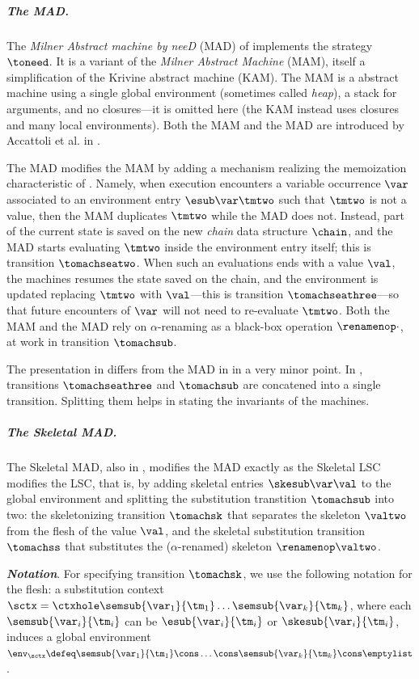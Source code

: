 \subparagraph{The MAD.} The \emph{Milner Abstract machine by neeD} (MAD) of  implements the \cbneed strategy $\toneed$. It is a \cbneed variant of the \emph{Milner Abstract Machine} (MAM), itself a simplification of the Krivine abstract machine (KAM). The MAM is a \cbn abstract machine using a single global environment (sometimes called \emph{heap}), a stack for arguments, and no closures---it is omitted here (the KAM instead uses closures and many local environments).  Both the MAM and the MAD are introduced by Accattoli et al. in \cite{DBLP:conf/icfp/AccattoliBM14}.

The MAD modifies the MAM by adding a mechanism realizing the memoization characteristic of \cbneed. Namely, when execution encounters a variable occurrence $\var$ associated to an environment entry $\esub\var\tmtwo$ such that $\tmtwo$ is not a value, then the MAM duplicates $\tmtwo$ while the MAD does not. Instead, part of the current state is saved on the new \emph{chain} data structure $\chain$, and the MAD starts evaluating $\tmtwo$ inside the environment entry itself; this is transition $\tomachseatwo$. When such an evaluations ends with a value $\val$, the machines resumes the state saved on the chain, and the environment is updated replacing $\tmtwo$ with $\val$---this is transition $\tomachseathree$---so that future encounters of $\var$ will not need to re-evaluate $\tmtwo$. Both the MAM and the MAD rely on $\alpha$-renaming as a black-box operation $\renamenop\cdot$, at work in transition $\tomachsub$.


The presentation in  differs from the MAD in \cite{DBLP:conf/icfp/AccattoliBM14} in a very minor point. In \cite{DBLP:conf/icfp/AccattoliBM14}, transitions $\tomachseathree$ and $\tomachsub$ are concatened into a single transition. Splitting them helps in stating the invariants of the machines.

\subparagraph{The Skeletal MAD.} The Skeletal MAD, also in , modifies the MAD exactly as the Skeletal \cbneed LSC modifies the \cbneed LSC, that is, by adding skeletal entries $\skesub\var\val$ to the global environment and splitting the substitution transtition $\tomachsub$ into two: the skeletonizing transition $\tomachsk$ that separates the skeleton $\valtwo$ from the flesh of the value $\val$, and the skeletal substitution transition $\tomachss$ that substitutes the ($\alpha$-renamed) skeleton $\renamenop\valtwo$. 

\textit{\textbf{Notation}}. For specifying transition $\tomachsk$, we use the following notation for the flesh: a substitution context $\sctx=\ctxhole\semsub{\var_1}{\tm_1}\ldots\semsub{\var_k}{\tm_k}$, where each $\semsub{\var_i}{\tm_i}$ can be $\esub{\var_i}{\tm_i}$ or $\skesub{\var_i}{\tm_i}$, induces a global environment $\env_\sctx \defeq \semsub{\var_1}{\tm_1}\cons\ldots\cons\semsub{\var_k}{\tm_k}\cons\emptylist$.

